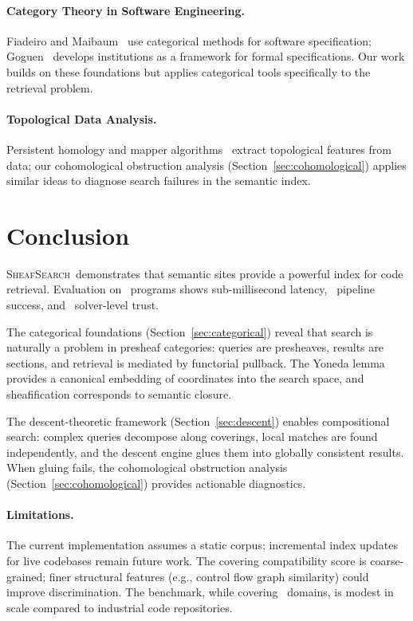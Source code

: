 \documentclass[11pt]{article}
\newcommand{\CodeSearch}{\textsc{SheafSearch}}
\begin{document}
\paragraph{Category Theory in Software Engineering.}
Fiadeiro and Maibaum~\cite{Fiadeiro1992} use categorical methods for
software specification; Goguen~\cite{Goguen1991} develops institutions
as a framework for formal specifications.  Our work builds on these
foundations but applies categorical tools specifically to the retrieval
problem.

\paragraph{Topological Data Analysis.}
Persistent homology and mapper algorithms~\cite{Carlsson2009} extract
topological features from data; our cohomological obstruction analysis
(Section~\ref{sec:cohomological}) applies similar ideas to diagnose
search failures in the semantic index.

\section{Conclusion}\label{sec:conclusion}

\CodeSearch\ demonstrates that semantic sites provide a powerful index
for code retrieval.  Evaluation on \compTotalPrograms\ programs shows
sub-millisecond latency, \compProfDiscoveryPipelineRate\ pipeline
success, and \compTrustSolverdischargedPct\ solver-level trust.

The categorical foundations (Section~\ref{sec:categorical}) reveal that
search is naturally a problem in presheaf categories: queries are
presheaves, results are sections, and retrieval is mediated by functorial
pullback.  The Yoneda lemma provides a canonical embedding of
coordinates into the search space, and sheafification corresponds to
semantic closure.

The descent-theoretic framework (Section~\ref{sec:descent}) enables
compositional search: complex queries decompose along coverings, local
matches are found independently, and the descent engine glues them into
globally consistent results.  When gluing fails, the cohomological
obstruction analysis (Section~\ref{sec:cohomological}) provides
actionable diagnostics.

\paragraph{Limitations.}
The current implementation assumes a static corpus; incremental index
updates for live codebases remain future work.  The covering
compatibility score is coarse-grained; finer structural features (e.g.,
control flow graph similarity) could improve discrimination.  The
benchmark, while covering \expDomainCount\ domains, is modest in scale
compared to industrial code repositories.
\end{document}
